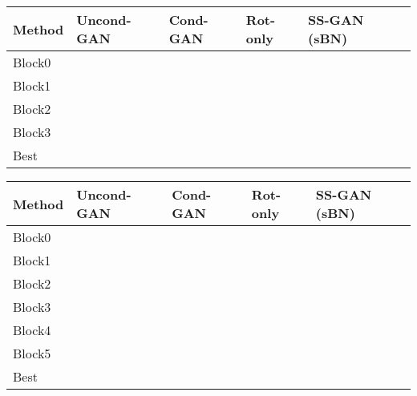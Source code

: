 \documentclass[10pt,twocolumn,letterpaper]{article}
\newcommand{\cifar}{\textsc{cifar10}}
\newcommand{\imagenet}{\textsc{imagenet}}
\begin{document}
\begin{table*}
  \centering
  \caption{\label{tab:cifar10_top1_full} Top-1 accuracy on \cifar{} with standard variations.}
  \begin{tabular}{llllll}
\toprule
Method & Uncond-GAN & Cond-GAN & Rot-only & SS-GAN (sBN) \\
\midrule
Block0    &    &    &  & \\
Block1      &    &    &  &  \\
Block2 &    &    &  &  \\
Block3  &   &    &  &  \\
\midrule
Best &  &  &  &  \\
\bottomrule
\end{tabular}
 \end{table*}

\begin{table*}
  \centering
  \caption{\label{tab:imagenet_top1_full} Top-1 accuracy on \imagenet{} with standard variations.}
  \begin{tabular}{lllll}
\toprule
Method & Uncond-GAN & Cond-GAN & Rot-only & SS-GAN (sBN) \\
\midrule
Block0      &       &        &        &    \\
Block1      &       &        &        &    \\
Block2      &       &        &         &    \\
Block3      &       &        &         &    \\
Block4      &       &        &         &    \\
Block5      &       &        &         &    \\
\midrule
Best        &         &  &  &  \\
\bottomrule
\end{tabular}
 \end{table*}

\begin{figure*}[h]
\begin{center}
\end{center}
\caption{\label{fig:accuracy-steps-cifar} Top 1 accuracy on \cifar{} with training steps from 10k to 100k.}
\end{figure*}

\begin{figure*}[h]
\begin{center}
\end{center}
\caption{\label{fig:accuracy-steps-imagenet} Top 1 accuracy on \imagenet{} validation set with training steps from 10k to 1M.
}
\end{figure*}
\end{document}
